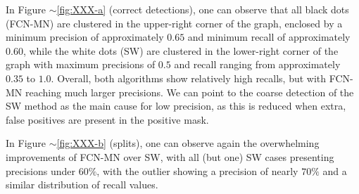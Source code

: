 \documentclass[a4paper,authoryear,review]{elsarticle}
\begin{document}
In Figure $\sim$\ref{fig:XXX-a} (correct detections), one can observe that all black dots (FCN-MN) are clustered in the upper-right corner of the graph, enclosed by a minimum precision of approximately $0.65$ and minimum recall of approximately $0.60$, while the white dots (SW) are clustered in the lower-right corner of the graph with maximum precisions of $0.5$ and recall ranging from approximately $0.35$ to $1.0$. Overall, both algorithms show relatively high recalls, but with FCN-MN reaching much larger precisions. We can point to the coarse detection of the SW method as the main cause for low precision, as this is reduced when extra, false positives are present in the positive mask. 

In Figure $\sim$\ref{fig:XXX-b} (splits), one can observe again the overwhelming improvements of FCN-MN over SW, with all (but one) SW cases presenting precisions under $60\%$, with the outlier showing a precision of nearly  $70\%$ and a similar distribution of recall values.  


\end{document}

